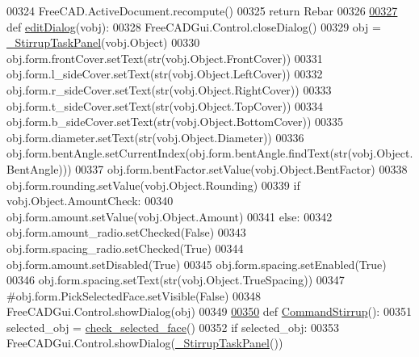 \begin{DoxyCode}
00324     FreeCAD.ActiveDocument.recompute()
00325     \textcolor{keywordflow}{return} Rebar
00326 
\hypertarget{Stirrup_8py_source.tex_l00327}{}\hyperlink{namespaceStirrup_a8ebd17322b7f4f5fe9e50bd578ba670d}{00327} \textcolor{keyword}{def }\hyperlink{namespaceStirrup_a8ebd17322b7f4f5fe9e50bd578ba670d}{editDialog}(vobj):
00328     FreeCADGui.Control.closeDialog()
00329     obj = \hyperlink{classStirrup_1_1__StirrupTaskPanel}{\_StirrupTaskPanel}(vobj.Object)
00330     obj.form.frontCover.setText(str(vobj.Object.FrontCover))
00331     obj.form.l\_sideCover.setText(str(vobj.Object.LeftCover))
00332     obj.form.r\_sideCover.setText(str(vobj.Object.RightCover))
00333     obj.form.t\_sideCover.setText(str(vobj.Object.TopCover))
00334     obj.form.b\_sideCover.setText(str(vobj.Object.BottomCover))
00335     obj.form.diameter.setText(str(vobj.Object.Diameter))
00336     obj.form.bentAngle.setCurrentIndex(obj.form.bentAngle.findText(str(vobj.Object.BentAngle)))
00337     obj.form.bentFactor.setValue(vobj.Object.BentFactor)
00338     obj.form.rounding.setValue(vobj.Object.Rounding)
00339     \textcolor{keywordflow}{if} vobj.Object.AmountCheck:
00340         obj.form.amount.setValue(vobj.Object.Amount)
00341     \textcolor{keywordflow}{else}:
00342         obj.form.amount\_radio.setChecked(\textcolor{keyword}{False})
00343         obj.form.spacing\_radio.setChecked(\textcolor{keyword}{True})
00344         obj.form.amount.setDisabled(\textcolor{keyword}{True})
00345         obj.form.spacing.setEnabled(\textcolor{keyword}{True})
00346         obj.form.spacing.setText(str(vobj.Object.TrueSpacing))
00347     \textcolor{comment}{#obj.form.PickSelectedFace.setVisible(False)}
00348     FreeCADGui.Control.showDialog(obj)
00349 
\hypertarget{Stirrup_8py_source.tex_l00350}{}\hyperlink{namespaceStirrup_a3863ce61c716794557101a50f41597b5}{00350} \textcolor{keyword}{def }\hyperlink{namespaceStirrup_a3863ce61c716794557101a50f41597b5}{CommandStirrup}():
00351     selected\_obj = \hyperlink{namespaceRebarfunc_adae2713855a7e1b4bda04081ae671542}{check\_selected\_face}()
00352     \textcolor{keywordflow}{if} selected\_obj:
00353         FreeCADGui.Control.showDialog(\hyperlink{classStirrup_1_1__StirrupTaskPanel}{\_StirrupTaskPanel}())
\end{DoxyCode}
